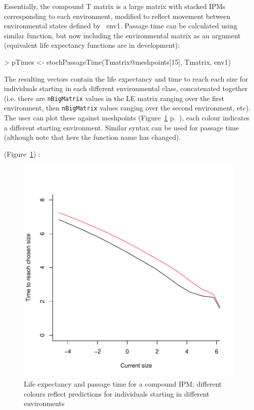 \documentclass{article}
\begin{document}
Essentially, the compound T matrix is a large matrix with stacked IPMs
corresponding to each environment, modified to reflect movement
between environmental states defined by {\ env1}. Passage time can be
calculated using similar function, but now including the environmental
matrix as an argument (equivalent life expectancy functions are in development): 
\begin{Schunk}
\begin{Sinput}
> pTimes <- stochPassageTime(Tmatrix@meshpoints[15], Tmatrix, env1)
\end{Sinput}
\end{Schunk}
The resulting vectors contain the life expectancy and time to reach each size for individuals starting in each different environmental class, concatenated together (i.e. there are {\tt nBigMatrix} values in the LE matrix ranging over the first environment, then {\tt nBigMatrix} values ranging over the second environment, etc). The user can plot these against meshpoints 
(Figure~\ref{fig:five} p.~\pageref{fig:five}), 
each colour indicates a different starting environment. Similar syntax can be used for passage time (although note that here the function name has changed).  

(Figure~\ref{fig:five}) : 
\begin{figure}
\begin{center}
\includegraphics{IPMpack_Vignette-fig5}
\end{center}
\caption{Life expectancy and passage time for a compound IPM;   different colours reflect predictions for individuals starting in different environments}
\label{fig:five}
\end{figure}
\end{document}
